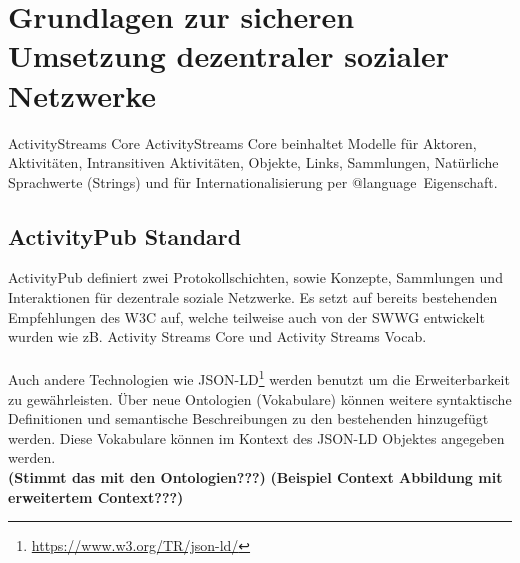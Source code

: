
\chapter{Grundlagen zur sicheren Umsetzung dezentraler sozialer Netzwerke}
\label{ch:fundamentals}
\glqq ActivityStreams Core\grqq
ActivityStreams Core beinhaltet Modelle für Aktoren, Aktivitäten, Intransitiven Aktivitäten, Objekte, Links, Sammlungen, Natürliche Sprachwerte (Strings) und für Internationalisierung per \glqq @language\grqq~Eigenschaft.
\section{ActivityPub Standard}
	ActivityPub definiert zwei Protokollschichten, sowie Konzepte, Sammlungen und Interaktionen für dezentrale soziale Netzwerke. Es setzt auf bereits bestehenden Empfehlungen des W3C auf, welche teilweise auch von der SWWG entwickelt wurden wie zB. Activity Streams Core und Activity Streams Vocab. 
	\\\\Auch andere Technologien wie JSON-LD\footnote{\url{https://www.w3.org/TR/json-ld/}} werden benutzt um die Erweiterbarkeit zu gewährleisten. Über neue Ontologien (Vokabulare) können weitere syntaktische Definitionen und semantische Beschreibungen zu den bestehenden hinzugefügt werden. Diese Vokabulare können im Kontext des JSON-LD Objektes angegeben werden.\\ 
	\textbf{(Stimmt das mit den Ontologien???)}
		\textbf{(Beispiel Context Abbildung mit erweitertem Context???)}

